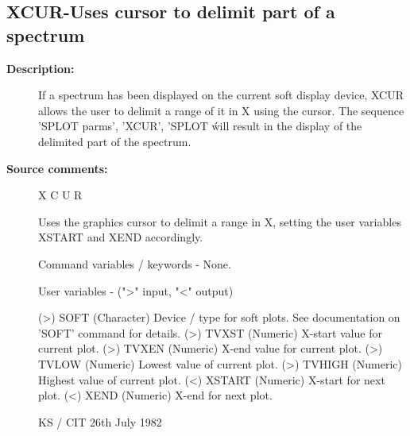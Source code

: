 \subsection{XCUR-\label{XCUR}Uses cursor to delimit part of a spectrum}
\begin{description}

\item [\textbf{Description:}]
 If a spectrum has been displayed on the current soft display
 device, XCUR allows the user to delimit a range of it in X using
 the cursor.  The sequence 'SPLOT parms', 'XCUR', 'SPLOT \' will
 result in the display of the delimited part of the spectrum.

\item [\textbf{Source comments:}]
\begin{terminalv}
 X C U R

 Uses the graphics cursor to delimit a range in X,
 setting the user variables XSTART and XEND accordingly.

 Command variables / keywords - None.

 User variables -     (">" input, "<" output)

 (>) SOFT     (Character) Device / type for soft plots.
              See documentation on 'SOFT' command for
              details.
 (>) TVXST    (Numeric) X-start value for current plot.
 (>) TVXEN    (Numeric) X-end value for current plot.
 (>) TVLOW    (Numeric) Lowest value of current plot.
 (>) TVHIGH   (Numeric) Highest value of current plot.
 (<) XSTART   (Numeric) X-start for next plot.
 (<) XEND     (Numeric) X-end for next plot.

                              KS / CIT 26th July 1982
\end{terminalv}
\end{description}
